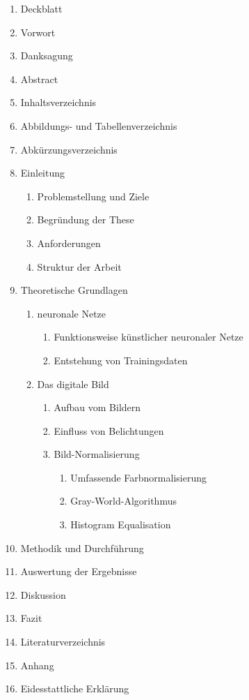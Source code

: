 \documentclass[a4paper,12pt,oneside]{article}
\begin{document}
  \begin{enumerate} %
  \item Deckblatt
  \item Vorwort
  \item Danksagung
  \item Abstract
  \item Inhaltsverzeichnis
  \item Abbildungs- und Tabellenverzeichnis
  \item Abkürzungsverzeichnis
  
  \item Einleitung
  \begin{enumerate} %
  \item Problemstellung und Ziele
  \item Begründung der These
  \item Anforderungen
  \item Struktur der Arbeit
  \end{enumerate} %
  \item Theoretische Grundlagen
  \begin{enumerate} %
  \item neuronale Netze
  \begin{enumerate} %
  \item Funktionsweise künstlicher neuronaler Netze
  \item Entstehung von Trainingsdaten
  \end{enumerate} %
  \item Das digitale Bild
  \begin{enumerate} %
  \item Aufbau vom Bildern
  \item Einfluss von Belichtungen
  \item Bild-Normalisierung
  \begin{enumerate}
  \item Umfassende Farbnormalisierung 
  \item Gray-World-Algorithmus
  \item Histogram Equalisation
  \end{enumerate}
  \end{enumerate} %
  \end{enumerate} %
  \item Methodik und Durchführung
  \item Auswertung der Ergebnisse
  \item Diskussion
  \item Fazit
  
  \item Literaturverzeichnis
  \item Anhang
  \item Eidesstattliche Erklärung
  \end{enumerate} \vspace{2 cm} %
 
\end{document}
